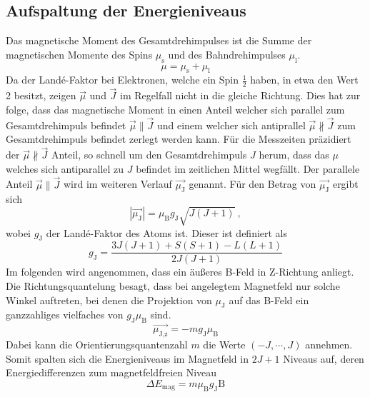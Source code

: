 \subsection{Aufspaltung der Energieniveaus}
Das magnetische Moment des Gesamtdrehimpulses ist die Summe der magnetischen Momente des Spins $\mu_\text{s}$ und des Bahndrehimpulses $\mu_\text{l}$.
\begin{equation}
  \mu = \mu_\text{s} + \mu_\text{l}
\end{equation}
Da der Landé-Faktor bei Elektronen, welche ein Spin $\frac{1}{2}$ haben, in etwa den Wert 2 besitzt, zeigen $\vec{\mu}$ und $\vec{J}$ im Regelfall nicht in die gleiche Richtung. Dies hat zur folge, dass das magnetische Moment in einen Anteil welcher sich parallel zum Gesamtdrehimpuls befindet $\vec{\mu} \parallel \vec{J}$ und einem welcher sich antiprallel $\vec{\mu} \nparallel \vec{J}$ zum Gesamtdrehimpuls befindet zerlegt werden kann. Für die Messzeiten präzidiert der  $\vec{\mu} \nparallel \vec{J}$ Anteil, so schnell um den Gesamtdrehimpuls $J$ herum, dass das $\mu$ welches sich antiparallel zu $J$ befindet im zeitlichen Mittel wegfällt. Der parallele Anteil $\vec{\mu} \parallel \vec{J}$ wird im weiteren Verlauf $\vec{\mu_\text{J}}$ genannt. Für den Betrag von $\vec{\mu_\text{J}}$ ergibt sich
\begin{equation}
  |\vec{\mu_\text{J}}| = \mu_\text{B} g_\text{J} \sqrt{J(J+1)} \ ,
  \label{eqn:muJ}
\end{equation}
wobei $g_\text{J}$ der Landé-Faktor des Atoms ist. Dieser ist definiert als
\begin{equation}
  g_\text{J} = \frac{3J(J+1) + S(S+1) -L(L+1)}{2J(J+1)}
  \label{eqn:Lan}
\end{equation}
Im folgenden wird angenommen, dass ein äußeres B-Feld in Z-Richtung anliegt. Die Richtungsquantelung besagt, dass bei angelegtem Magnetfeld nur solche Winkel auftreten, bei denen die Projektion von $\mu_\text{J}$ auf das B-Feld ein ganzzahliges vielfaches von $g_\text{J} \mu_\text{B}$ sind.
\begin{equation}
  \vec{\mu_\text{J,z}} = -m g_\text{J} \mu_\text{B}
  \label{eqn:mu}
\end{equation}
Dabei kann die Orientierungsquantenzahl $m$ die Werte $(-J, \cdots, J)$ annehmen. Somit spalten sich die Energieniveaus im Magnetfeld in $2J+1$ Niveaus auf, deren Energiedifferenzen zum magnetfeldfreien Niveau
\begin{equation}
  \Delta E_\text{mag} = m \mu_\text{B} g_\text{J} \text{B}
  \label{eqn:delE}
\end{equation}
